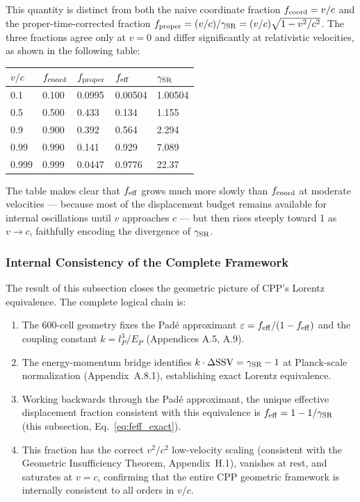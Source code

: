\documentclass[11pt,letterpaper]{article}
\begin{document}
This quantity is distinct from both the naive coordinate fraction $f_{\rm coord} = v/c$ and the proper-time-corrected fraction $f_{\rm proper} = (v/c)/\gamma_{\rm SR} = (v/c)\sqrt{1-v^2/c^2}$. 
The three fractions agree only at $v = 0$ and differ significantly at relativistic velocities, as shown in the following table:

\begin{center}
\begin{tabular}{lllll}
\toprule
$v/c$ & $f_{\rm coord}$ & $f_{\rm proper}$ & $f_{\rm eff}$ & 
$\gamma_{\rm SR}$ \\
\midrule
0.1 & 0.100 & 0.0995 & 0.00504 & 1.00504 \\
0.5 & 0.500 & 0.433 & 0.134 & 1.155 \\
0.9 & 0.900 & 0.392 & 0.564 & 2.294 \\
0.99 & 0.990 & 0.141 & 0.929 & 7.089 \\
0.999 & 0.999 & 0.0447 & 0.9776 & 22.37 \\
\bottomrule
\end{tabular}
\end{center}

The table makes clear that $f_{\rm eff}$ grows much more slowly than $f_{\rm coord}$ at moderate velocities — because most of the displacement budget remains available for internal oscillations until $v$ approaches $c$ — but then rises steeply toward 1 as $v \to c$, faithfully encoding the divergence of $\gamma_{\rm SR}$.

\subsubsection{Internal Consistency of the Complete Framework}

The result of this subsection closes the geometric picture of CPP's Lorentz equivalence. The complete logical chain is:

\begin{enumerate}
\item The 600-cell geometry fixes the Padé approximant 
$\varepsilon = f_{\rm eff}/(1-f_{\rm eff})$ and the coupling 
constant $k = l_P^3/E_P$ (Appendices A.5, A.9).

\item The energy-momentum bridge identifies $k\cdot\Delta\text{SSV} = \gamma_{\rm SR} - 1$ at Planck-scale normalization (Appendix~A.8.1), establishing exact Lorentz equivalence.

\item Working backwards through the Padé approximant, the unique effective displacement fraction consistent with this equivalence is $f_{\rm eff} = 1 - 1/\gamma_{\rm SR}$ (this subsection, Eq.~\ref{eq:feff_exact}).

\item This fraction has the correct $v^2/c^2$ low-velocity scaling (consistent with the Geometric Insufficiency Theorem, 
Appendix~H.1), vanishes at rest, and saturates at $v = c$, 
confirming that the entire CPP geometric framework is internally consistent to all orders in $v/c$.
\end{enumerate}
\end{document}
